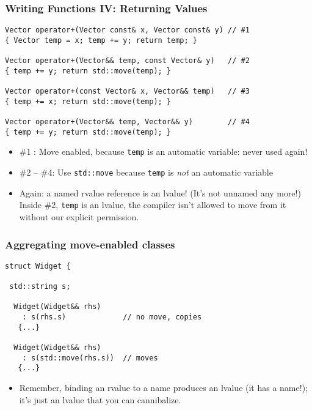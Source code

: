 
\begin{frame}[fragile]
\frametitle{Writing Functions IV: Returning Values}
{\scriptsize
\begin{verbatim}
Vector operator+(Vector const& x, Vector const& y) // #1
{ Vector temp = x; temp += y; return temp; }
 
Vector operator+(Vector&& temp, const Vector& y)   // #2
{ temp += y; return std::move(temp); }
 
Vector operator+(const Vector& x, Vector&& temp)   // #3
{ temp += x; return std::move(temp); }
 
Vector operator+(Vector&& temp, Vector&& y)        // #4
{ temp += y; return std::move(temp); }
\end{verbatim}
}
\begin{itemize}
\item \#1 : Move enabled, because \texttt{temp} is an automatic
  variable:  never used again!
\item \#2 -- \#4: Use \texttt{std::move} because \texttt{temp} is \emph{not}
  an automatic variable

\item Again: a named rvalue reference is an lvalue! (It's not unnamed any
  more!) Inside \#2, \texttt{temp} is an lvalue, the compiler isn't
  allowed to move from it without our explicit permission.
\end{itemize}


\end{frame}




\begin{frame}[fragile]
\frametitle{Aggregating move-enabled classes}
{\scriptsize
\begin{verbatim}
struct Widget {  

 std::string s;

  Widget(Widget&& rhs)
    : s(rhs.s)             // no move, copies
   {...}

  Widget(Widget&& rhs)
    : s(std::move(rhs.s))  // moves
   {...}
\end{verbatim}
}
\begin{itemize}
\item Remember, binding an rvalue to a name produces an lvalue (it
  has a name!); it's just an lvalue that you can cannibalize.
\end{itemize}


\end{frame}

